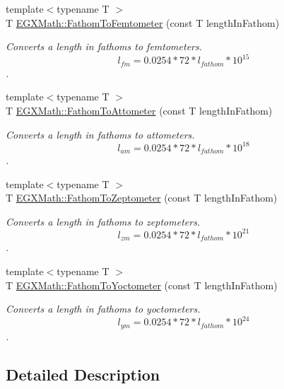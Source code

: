 \begin{DoxyCompactItemize}
{\footnotesize template$<$typename T $>$ }\\T \mbox{\hyperlink{group___e_g_x_math-_conversions-_length_conversions-_imperial-_fathom-_s_i_ga507bda2a437e3cccfda56c2e48ad7262}{E\+G\+X\+Math\+::\+Fathom\+To\+Femtometer}} (const T length\+In\+Fathom)
\begin{DoxyCompactList}\small\item\em Converts a length in fathoms to femtometers. \[ l_{fm}=0.0254 * 72 * l_{fathom} * 10^{15} \]. \end{DoxyCompactList}\item 
{\footnotesize template$<$typename T $>$ }\\T \mbox{\hyperlink{group___e_g_x_math-_conversions-_length_conversions-_imperial-_fathom-_s_i_ga9cc357e26a4f582c83487932d82e09cb}{E\+G\+X\+Math\+::\+Fathom\+To\+Attometer}} (const T length\+In\+Fathom)
\begin{DoxyCompactList}\small\item\em Converts a length in fathoms to attometers. \[ l_{am}=0.0254 * 72 * l_{fathom} * 10^{18} \]. \end{DoxyCompactList}\item 
{\footnotesize template$<$typename T $>$ }\\T \mbox{\hyperlink{group___e_g_x_math-_conversions-_length_conversions-_imperial-_fathom-_s_i_ga2ce11498768b6c37b65bce7b6915d153}{E\+G\+X\+Math\+::\+Fathom\+To\+Zeptometer}} (const T length\+In\+Fathom)
\begin{DoxyCompactList}\small\item\em Converts a length in fathoms to zeptometers. \[ l_{zm}=0.0254 * 72 * l_{fathom} * 10^{21} \]. \end{DoxyCompactList}\item 
{\footnotesize template$<$typename T $>$ }\\T \mbox{\hyperlink{group___e_g_x_math-_conversions-_length_conversions-_imperial-_fathom-_s_i_ga0b22b9db2c224dadfd62934797f14090}{E\+G\+X\+Math\+::\+Fathom\+To\+Yoctometer}} (const T length\+In\+Fathom)
\begin{DoxyCompactList}\small\item\em Converts a length in fathoms to yoctometers. \[ l_{ym}=0.0254 * 72 * l_{fathom} * 10^{24} \]. \end{DoxyCompactList}\end{DoxyCompactItemize}


\subsection{Detailed Description}


